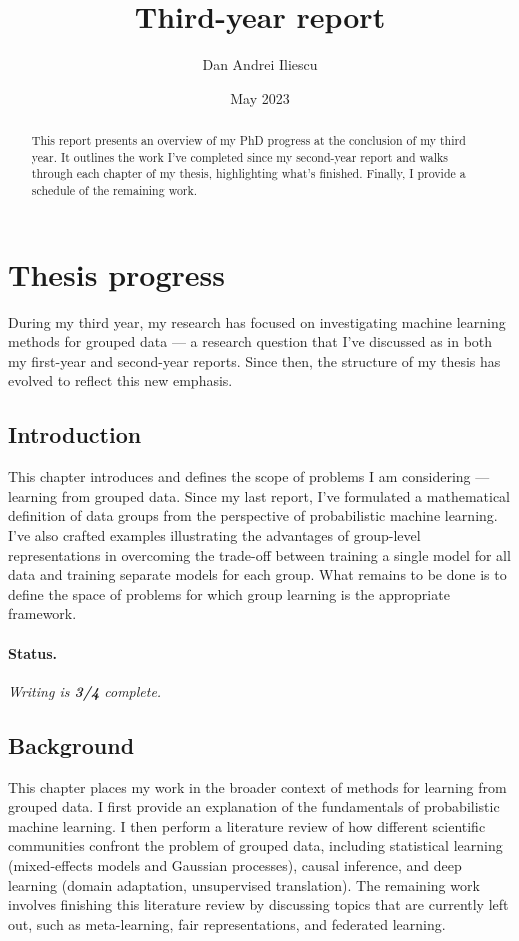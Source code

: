 \documentclass[a4paper]{article}
\title{Third-year report}
\author{Dan Andrei Iliescu}
\date{May 2023}
\begin{document}
\maketitle

\begin{abstract}
    This report presents an overview of my PhD progress at the conclusion of my third year. It outlines the work I've completed since my second-year report and walks through each chapter of my thesis, highlighting what's finished. Finally, I provide a schedule of the remaining work.
\end{abstract}

\section{Thesis progress}

During my third year, my research has focused on investigating machine learning methods for grouped data --- a research question that I've discussed as in both my first-year and second-year reports. Since then, the structure of my thesis has evolved to reflect this new emphasis.

\subsection{Introduction}

This chapter introduces and defines the scope of problems I am considering --- learning from grouped data. Since my last report, I've formulated a mathematical definition of data groups from the perspective of probabilistic machine learning. I've also crafted examples illustrating the advantages of group-level representations in overcoming the trade-off between training a single model for all data and training separate models for each group. What remains to be done is to define the space of problems for which group learning is the appropriate framework.

\paragraph{Status.} \textit{Writing is \textbf{3/4} complete.} 

\subsection{Background}

This chapter places my work in the broader context of methods for learning from grouped data. I first provide an explanation of the fundamentals of probabilistic machine learning. I then perform a literature review of how different scientific communities confront the problem of grouped data, including statistical learning (mixed-effects models and Gaussian processes), causal inference, and deep learning (domain adaptation, unsupervised translation). The remaining work involves finishing this literature review by discussing topics that are currently left out, such as meta-learning, fair representations, and federated learning.
\end{document}
